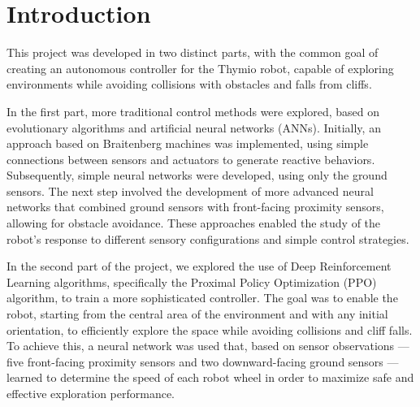 \documentclass[final,5p,times,twocolumn,authoryear]{elsarticle}
\begin{document}
\begin{frontmatter}




\begin{abstract}

\end{abstract}


\end{frontmatter}





\section{Introduction}
\label{introduction}

This project was developed in two distinct parts, with the common goal of creating an autonomous controller for the Thymio robot, capable of exploring environments while avoiding collisions with obstacles and falls from cliffs.

In the first part, more traditional control methods were explored, based on evolutionary algorithms and artificial neural networks (ANNs). Initially, an approach based on Braitenberg machines was implemented, using simple connections between sensors and actuators to generate reactive behaviors. Subsequently, simple neural networks were developed, using only the ground sensors. The next step involved the development of more advanced neural networks that combined ground sensors with front-facing proximity sensors, allowing for obstacle avoidance. These approaches enabled the study of the robot’s response to different sensory configurations and simple control strategies.

In the second part of the project, we explored the use of Deep Reinforcement Learning algorithms, specifically the Proximal Policy Optimization (PPO) algorithm, to train a more sophisticated controller. The goal was to enable the robot, starting from the central area of the environment and with any initial orientation, to efficiently explore the space while avoiding collisions and cliff falls. To achieve this, a neural network was used that, based on sensor observations — five front-facing proximity sensors and two downward-facing ground sensors — learned to determine the speed of each robot wheel in order to maximize safe and effective exploration performance.
\end{document}
